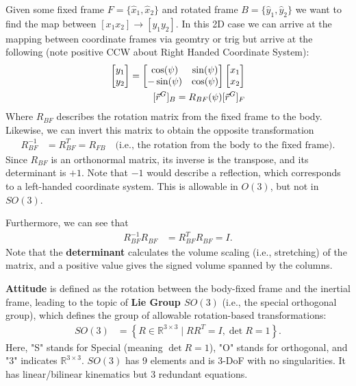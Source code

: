 \documentclass{article}
\begin{document}
Given some fixed frame $F = \{\hat{x}_1, \hat{x}_2\}$ and rotated frame $B = \{\hat{y}_1, \hat{y}_2\}$ we want to find the map between $[x_1 x_2] \to [y_1 y_2]$. In this 2D case we can arrive at the mapping between coordinate frames via geomtry or trig but arrive at the following (note positive CCW about Right Handed Coordinate System):
\begin{align}
    \begin{bmatrix}y_1 \\ y_2\end{bmatrix} = \begin{bmatrix}\cos(\psi) & \sin(\psi)\\-\sin(\psi) & \cos(\psi)\end{bmatrix} \begin{bmatrix} x_1 \\ x_2 \end{bmatrix} \notag \\
    [\vec{r}^G]_B = R_{BF}(\psi)[\vec{r}^G]_F
\end{align}
Where $R_{BF}$ describes the rotation matrix from the fixed frame to the body. Likewise, we can invert this matrix to obtain the opposite transformation
\begin{align*}
R_{BF}^{-1} &= R_{BF}^T = R_{FB} \quad \text{(i.e., the rotation from the body to the fixed frame)}.
\end{align*}
Since $R_{BF}$ is an orthonormal matrix, its inverse is the transpose, and its determinant is $+1$. Note that $-1$ would describe a reflection, which corresponds to a left-handed coordinate system. This is allowable in $O(3)$, but not in $SO(3)$.

Furthermore, we can see that
\begin{align*}
R_{BF}^{-1} R_{BF} &= R_{BF}^T R_{BF} = I.
\end{align*}
Note that the \textbf{determinant} calculates the volume scaling (i.e., stretching) of the matrix, and a positive value gives the signed volume spanned by the columns. 

\textbf{Attitude} is defined as the rotation between the body-fixed frame and the inertial frame, leading to the topic of \textbf{Lie Group $SO(3)$} (i.e., the special orthogonal group), which defines the group of allowable rotation-based transformations:
\begin{align*}
SO(3) &= \left\{ R \in \mathbb{R}^{3 \times 3} \mid R R^T = I, \det R = 1 \right\}.
\end{align*}
Here, "S" stands for Special (meaning $\det R = 1$), "O" stands for orthogonal, and "3" indicates $\mathbb{R}^{3 \times 3}$. $SO(3)$ has 9 elements and is 3-DoF with no singularities. It has linear/bilinear kinematics but 3 redundant equations.
\end{document}
